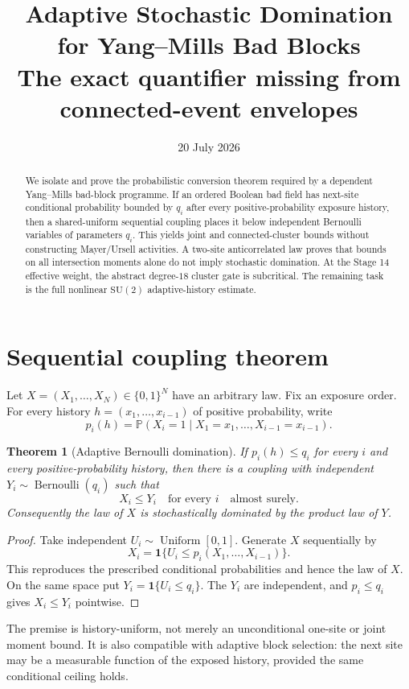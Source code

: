 \documentclass[11pt]{article}
\title{Adaptive Stochastic Domination for Yang--Mills Bad Blocks\\
\large The exact quantifier missing from connected-event envelopes}
\author{}
\date{20 July 2026}
\newtheorem{theorem}{Theorem}[section]
\begin{document}
\maketitle

\begin{abstract}
We isolate and prove the probabilistic conversion theorem required by a
dependent Yang--Mills bad-block programme.  If an ordered Boolean bad field
has next-site conditional probability bounded by $q_i$ after every
positive-probability exposure history, then a shared-uniform sequential
coupling places it below independent Bernoulli variables of parameters $q_i$.
This yields joint and connected-cluster bounds without constructing
Mayer/Ursell activities.  A two-site anticorrelated law proves that bounds on
all intersection moments alone do not imply stochastic domination.  At the
Stage 14 effective weight, the abstract degree-$18$ cluster gate is
subcritical.  The remaining task is the full nonlinear $\mathrm{SU}(2)$
adaptive-history estimate.
\end{abstract}

\section{Sequential coupling theorem}

Let $X=(X_1,\ldots,X_N)\in\{0,1\}^N$ have an arbitrary law.  Fix an exposure
order.  For every history $h=(x_1,\ldots,x_{i-1})$ of positive probability,
write
\[
 p_i(h)=\mathbb P(X_i=1\mid X_1=x_1,\ldots,X_{i-1}=x_{i-1}).
\]

\begin{theorem}[Adaptive Bernoulli domination]
If $p_i(h)\leq q_i$ for every $i$ and every positive-probability history,
then there is a coupling with independent
$Y_i\sim\operatorname{Bernoulli}(q_i)$ such that
\[
 X_i\leq Y_i\quad\text{for every }i\quad\text{almost surely}.
\]
Consequently the law of $X$ is stochastically dominated by the product law of
$Y$.
\end{theorem}
\begin{proof}
Take independent $U_i\sim\operatorname{Uniform}[0,1]$.  Generate $X$
sequentially by
\[
 X_i=\mathbf 1\{U_i\leq p_i(X_1,\ldots,X_{i-1})\}.
\]
This reproduces the prescribed conditional probabilities and hence the law of
$X$.  On the same space put $Y_i=\mathbf 1\{U_i\leq q_i\}$.  The $Y_i$ are
independent, and $p_i\leq q_i$ gives $X_i\leq Y_i$ pointwise.
\end{proof}

The premise is history-uniform, not merely an unconditional one-site or joint
moment bound.  It is also compatible with adaptive block selection: the next
site may be a measurable function of the exposed history, provided the same
conditional ceiling holds.
\end{document}

